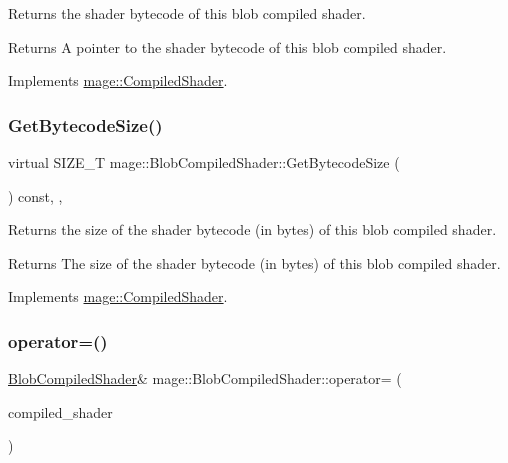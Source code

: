 Returns the shader bytecode of this blob compiled shader.

\begin{DoxyReturn}{Returns}
A pointer to the shader bytecode of this blob compiled shader. 
\end{DoxyReturn}


Implements \hyperlink{structmage_1_1_compiled_shader_a3d7a58d568dc30e66ea7488f28911127}{mage\+::\+Compiled\+Shader}.

\hypertarget{structmage_1_1_blob_compiled_shader_a685f2a4aac87aa785c22940075eb23ec}{}\label{structmage_1_1_blob_compiled_shader_a685f2a4aac87aa785c22940075eb23ec} 
\subsubsection{\texorpdfstring{Get\+Bytecode\+Size()}{GetBytecodeSize()}}
{\footnotesize\ttfamily virtual S\+I\+Z\+E\+\_\+T mage\+::\+Blob\+Compiled\+Shader\+::\+Get\+Bytecode\+Size (\begin{DoxyParamCaption}{ }\end{DoxyParamCaption}) const\hspace{0.3cm}{\ttfamily [override]}, {\ttfamily [virtual]}, {\ttfamily [noexcept]}}

Returns the size of the shader bytecode (in bytes) of this blob compiled shader.

\begin{DoxyReturn}{Returns}
The size of the shader bytecode (in bytes) of this blob compiled shader. 
\end{DoxyReturn}


Implements \hyperlink{structmage_1_1_compiled_shader_ae9dbc3c205d54cc89b9b0746b76b157b}{mage\+::\+Compiled\+Shader}.

\hypertarget{structmage_1_1_blob_compiled_shader_a631f7c06a43c7877cd9ce1a32ed8740d}{}\label{structmage_1_1_blob_compiled_shader_a631f7c06a43c7877cd9ce1a32ed8740d} 
\subsubsection{\texorpdfstring{operator=()}{operator=()}\hspace{0.1cm}{\footnotesize\ttfamily [1/2]}}
{\footnotesize\ttfamily \hyperlink{structmage_1_1_blob_compiled_shader}{Blob\+Compiled\+Shader}\& mage\+::\+Blob\+Compiled\+Shader\+::operator= (\begin{DoxyParamCaption}\item[{const \hyperlink{structmage_1_1_blob_compiled_shader}{Blob\+Compiled\+Shader} \&}]{compiled\+\_\+shader }\end{DoxyParamCaption})\hspace{0.3cm}{\ttfamily [delete]}}

